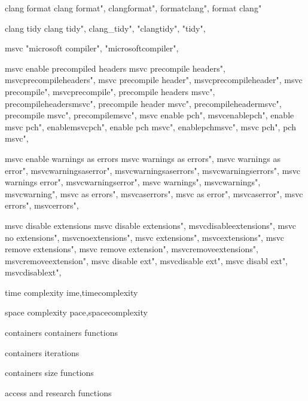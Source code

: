          clang format 
        clang format",
        clangformat",
        formatclang",
        format clang"
        
         clang tidy 
        clang tidy",  
        clang_tidy", "clangtidy", "tidy",  
        
         msvc  
         "microsoft compiler", "microsoftcompiler",  
        
         msvc enable precompiled headers 
        msvc precompile headers",  
        msvcprecompileheaders",  
        msvc precompile header",  
        msvcprecompileheader",  
        msvc precompile",  
        msvcprecompile",  
        precompile headers msvc",  
        precompileheadersmsvc",  
        precompile header msvc",  
        precompileheadermsvc",  
        precompile msvc",  
        precompilemsvc",  
        msvc enable pch",  
        msvcenablepch",  
        enable msvc pch",  
        enablemsvcpch",  
        enable pch msvc",  
        enablepchmsvc",  
        msvc pch",  
        pch msvc",  
        
         msvc enable warnings as errors
        msvc warnings as errors", 
        msvc warnings as error", 
        msvcwarningsaserror", 
        msvcwarningsaserrors", 
        msvcwarningserrors", 
        msvc warnings error", 
        msvcwarningserror", 
        msvc warnings", 
        msvcwarnings", 
        msvcwarning", 
        msvc as errors", 
        msvcaserrors", 
        msvc as error", 
        msvcaserror", 
        msvc errors", 
        msvcerrors", 
        
         msvc disable extensions 
        msvc disable extensions", 
        msvcdisableextensions", 
        msvc no extensions", 
        msvcnoextensions", 
        msvc extensions", 
        msvcextensions", 
        msvc remove extensions", 
        msvc remove extension", 
        msvcremoveextensions", 
        msvcremoveextension", 
        msvc disable ext", 
        msvcdisable ext", 
        msvc disabl ext", 
        msvcdisablext", 

         time complexity
        ime,timecomplexity
        
         space complexity
        pace,spacecomplexity
        
         containers
         containers functions
        
         containers iterations
        
         containers size functions 
        
         access and research functions 
        
